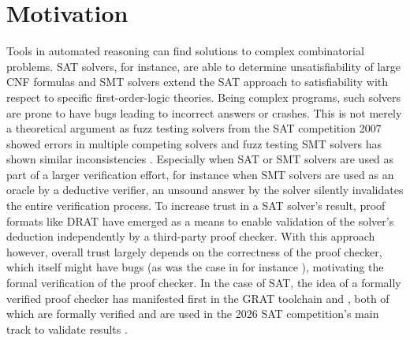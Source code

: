 \section{Motivation}\label{sec:motivation}

Tools in automated reasoning can find solutions to complex combinatorial problems.
SAT solvers, for instance, are able to determine unsatisfiability of large CNF formulas and SMT solvers extend the SAT approach to satisfiability with respect to specific first-order-logic theories.
Being complex programs, such solvers are prone to have bugs leading to incorrect answers or crashes.
This is not merely a theoretical argument as fuzz testing solvers from the SAT competition 2007 showed errors in multiple competing solvers \cite{sat-fuzzing-2007} and fuzz testing SMT solvers has shown similar inconsistencies \cite{smt-fuzzing,smt-fuzzing-2020}.
Especially when SAT or SMT solvers are used as part of a larger verification effort, for instance when SMT solvers are used as an oracle by a deductive verifier, an unsound answer by the solver silently invalidates the entire verification process.
To increase trust in a SAT solver's result, proof formats like DRAT \cite{DRAT} have emerged as a means to enable validation of the solver's deduction independently by a third-party proof checker.
With this approach however, overall trust largely depends on the correctness of the proof checker, which itself might have bugs (as was the case in  \cite{drat-trim} for instance \cite{Lammich2020}), motivating the formal verification of the proof checker.
In the case of SAT, the idea of a formally verified proof checker has manifested first in the GRAT toolchain \cite{Lammich2020} and  \cite{cake-lpr}, both of which are formally verified and are used in the 2026 SAT competition's main track to validate results \cite{satcomp2026output}.

